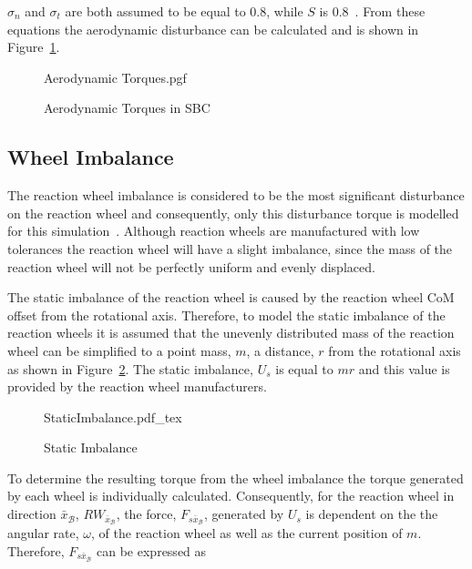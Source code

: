 $\sigma_n$ and $\sigma_t$ are both assumed to be equal to 0.8, while $S$ is $\num{0.8}$~\cite{steyn2011CubeSat}. From these equations the aerodynamic disturbance can be calculated and is shown in Figure~\ref{fig:AerodynamicTorques}.
\begin{figure}[!htb]
	\centering
	\def\pgfwidth{10cm}
	{Aerodynamic Torques.pgf}
	
	\caption{Aerodynamic Torques in SBC}
	\label{fig:AerodynamicTorques}
\end{figure}

\subsection{Wheel Imbalance}
The reaction wheel imbalance is considered to be the most significant disturbance on the reaction wheel and consequently, only this disturbance torque is modelled for this simulation~\cite{bialke1998high}. Although reaction wheels are manufactured with low tolerances the reaction wheel will have a slight imbalance, since the mass of the reaction wheel will not be perfectly uniform and evenly displaced. 

The static imbalance of the reaction wheel is caused by the reaction wheel CoM offset from the rotational axis. Therefore, to model the static imbalance of the reaction wheels it is assumed that the unevenly distributed mass of the reaction wheel can be simplified to a point mass, $m$, a distance, $r$ from the rotational axis as shown in Figure~\ref{fig:StaticImbalance}. The static imbalance, $U_s$ is equal to $mr$ and this value is provided by the reaction wheel manufacturers.

\begin{figure}[!htb]
	\centering
	\def\svgwidth{10cm}
	{StaticImbalance.pdf_tex}
	\caption{Static Imbalance}
	\label{fig:StaticImbalance}
\end{figure}

To determine the resulting torque from the wheel imbalance the torque generated by each wheel is individually calculated. Consequently, for the reaction wheel in direction $\bar{x}_\mathcal{B}$, $RW_{\bar{x}_\mathcal{B}}$, the force, $F_{s\bar{x}_\mathcal{B}}$, generated by $U_s$ is dependent on the the angular rate, $\omega$, of the reaction wheel as well as the current position of $m$. Therefore, $F_{s\bar{x}_\mathcal{B}}$ can be expressed as


